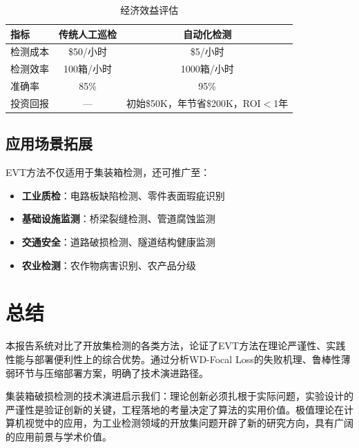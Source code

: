 \documentclass[12pt,a4paper]{ctexart}
\theoremstyle{cumcm}
\begin{document}
\begin{table}[H]
\centering
{}
\caption{经济效益评估}
\begin{tabular}{lcc}
\toprule
\textbf{指标} & \textbf{传统人工巡检} & \textbf{自动化检测} \\
\midrule
检测成本 & \$50/小时 & \$5/小时 \\
检测效率 & 100箱/小时 & 1000箱/小时 \\
准确率 & 85\% & 95\% \\
投资回报 & — & 初始\$50K，年节省\$200K，ROI$<$1年 \\
\bottomrule
\end{tabular}
\end{table}

\subsection{应用场景拓展}

EVT方法不仅适用于集装箱检测，还可推广至：
\begin{itemize}
\item \textbf{工业质检}：电路板缺陷检测、零件表面瑕疵识别
\item \textbf{基础设施监测}：桥梁裂缝检测、管道腐蚀监测
\item \textbf{交通安全}：道路破损检测、隧道结构健康监测
\item \textbf{农业检测}：农作物病害识别、农产品分级
\end{itemize}

\section{总结}

本报告系统对比了开放集检测的各类方法，论证了EVT方法在理论严谨性、实践性能与部署便利性上的综合优势。通过分析WD-Focal Loss的失败机理、鲁棒性薄弱环节与压缩部署方案，明确了技术演进路径。

集装箱破损检测的技术演进启示我们：理论创新必须扎根于实际问题，实验设计的严谨性是验证创新的关键，工程落地的考量决定了算法的实用价值。极值理论在计算机视觉中的应用，为工业检测领域的开放集问题开辟了新的研究方向，具有广阔的应用前景与学术价值。
\end{document}
